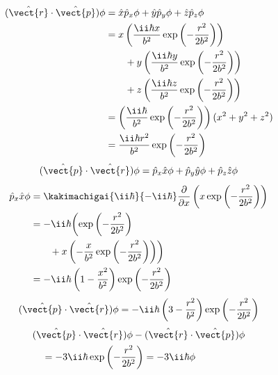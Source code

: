 \begin{align*}
(\hat{\vect{r}}\cdot\hat{\vect{p}})\phi&=\hat{x}\hat{p}_{x}\phi+\hat{y}\hat{p}_{y}\phi+\hat{z}\hat{p}_{z}\phi\\
&=x\left(\frac{\ii\hbar x}{b^{2}}\exp\left(-\frac{r^{2}}{2b^{2}}\right)\right)\\
&\qquad+y\left(\frac{\ii\hbar y}{b^{2}}\exp\left(-\frac{r^{2}}{2b^{2}}\right)\right)\\
&\qquad+z\left(\frac{\ii\hbar z}{b^{2}}\exp\left(-\frac{r^{2}}{2b^{2}}\right)\right)\\
&=\left(\frac{\ii\hbar}{b^{2}}\exp\left(-\frac{r^{2}}{2b^{2}}\right)\right)(x^{2}+y^{2}+z^{2})\\
&=\frac{\ii\hbar r^{2}}{b^{2}}\exp\left(-\frac{r^{2}}{2b^{2}}\right)
\end{align*}
\[ (\hat{\vect{p}}\cdot\hat{\vect{r}})\phi=\hat{p}_{x}\hat{x}\phi+\hat{p}_{y}\hat{y}\phi+\hat{p}_{z}\hat{z}\phi \]
\begin{align*}
\hat{p}_{x}\hat{x}\phi&=\kakimachigai{\ii\hbar}{-\ii\hbar}\frac{\partial}{\partial x}\left(x\exp\left(-\frac{r^{2}}{2b^{2}}\right)\right)\\
&=-\ii\hbar\biggl(\exp\left(-\frac{r^{2}}{2b^{2}}\right)\\
&\qquad+x\left(-\frac{x}{b^{2}}\exp\left(-\frac{r^{2}}{2b^{2}}\right)\right)\biggr)\\
&=-\ii\hbar\left(1-\frac{x^{2}}{b^{2}}\right)\exp\left(-\frac{r^{2}}{2b^{2}}\right)
\end{align*}
\[ (\hat{\vect{p}}\cdot\hat{\vect{r}})\phi=-\ii\hbar\left(3-\frac{r^{2}}{b^{2}}\right)\exp\left(-\frac{r^{2}}{2b^{2}}\right) \]
\begin{align*}
&(\hat{\vect{p}}\cdot\hat{\vect{r}})\phi-(\hat{\vect{r}}\cdot\hat{\vect{p}})\phi\\
&\quad=-3\ii\hbar\exp\left(-\frac{r^{2}}{2b^{2}}\right)=-3\ii\hbar\phi
\end{align*}

